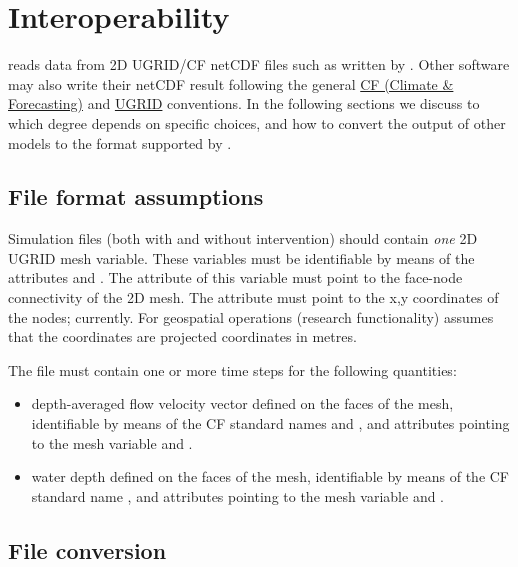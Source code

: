 \chapter{Interoperability} \label{Chp:Sim2Ugrid}

\dfastmi reads data from 2D UGRID/CF netCDF files such as written by \dflowfm.
Other software may also write their netCDF result following the general \href{https://cfconventions.org/}{CF (Climate \& Forecasting)} and \href{http://ugrid-conventions.github.io/ugrid-conventions/}{UGRID} conventions.
In the following sections we discuss to which degree \dfmi depends on \dflowfm specific choices, and how to convert the output of other models to the format supported by \dfmi.

\section{File format assumptions}

Simulation files (both with and without intervention) should contain \emph{one} 2D UGRID mesh variable.
These variables must be identifiable by means of the attributes  and .
The  attribute of this variable must point to the face-node connectivity of the 2D mesh.
The  attribute must point to the x,y coordinates of the nodes; currently.
For geospatial operations (research functionality) \dfmi assumes that the coordinates are projected coordinates in metres.

The file must contain one or more time steps for the following quantities:
\begin{itemize}
\item depth-averaged flow velocity vector defined on the faces of the mesh, identifiable by means of the CF standard names  and , and attributes  pointing to the mesh variable and .
\item water depth defined on the faces of the mesh, identifiable by means of the CF standard name , and attributes  pointing to the mesh variable and .
\end{itemize}

\section{File conversion}

